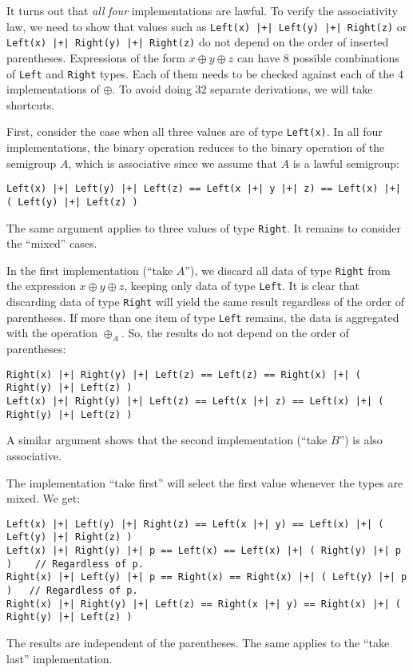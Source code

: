 It turns out that \emph{all} \emph{four} implementations are lawful.
To verify the associativity law, we need to show that values such
as \lstinline!Left(x) |+| Left(y) |+| Right(z)! or \lstinline!Left(x) |+| Right(y) |+| Right(z)!
do not depend on the order of inserted parentheses. Expressions of
the form $x\oplus y\oplus z$ can have $8$ possible combinations
of \lstinline!Left! and \lstinline!Right! types. Each of them needs
to be checked against each of the $4$ implementations of $\oplus$.
To avoid doing $32$ separate derivations, we will take shortcuts.

First, consider the case when all three values are of type \lstinline!Left(x)!.
In all four implementations, the binary operation reduces to the binary
operation of the semigroup $A$, which is associative since we assume
that $A$ is a lawful semigroup:
\begin{lstlisting}
Left(x) |+| Left(y) |+| Left(z) == Left(x |+| y |+| z) == Left(x) |+| ( Left(y) |+| Left(z) )
\end{lstlisting}

The same argument applies to three values of type \lstinline!Right!.
It remains to consider the \textsf{``}mixed\textsf{''} cases.

In the first implementation (\textsf{``}take $A$\textsf{''}), we discard all data
of type \lstinline!Right! from the expression $x\oplus y\oplus z$,
keeping only data of type \lstinline!Left!. It is clear that discarding
data of type \lstinline!Right! will yield the same result regardless
of the order of parentheses. If more than one item of type \lstinline!Left!
remains, the data is aggregated with the operation $\oplus_{A}$.
So, the results do not depend on the order of parentheses:
\begin{lstlisting}
Right(x) |+| Right(y) |+| Left(z) == Left(z) == Right(x) |+| ( Right(y) |+| Left(z) )
Left(x) |+| Right(y) |+| Left(z) == Left(x |+| z) == Left(x) |+| ( Right(y) |+| Left(z) )
\end{lstlisting}

A similar argument shows that the second implementation (\textsf{``}take $B$\textsf{''})
is also associative.

The implementation \textsf{``}take first\textsf{''} will select the first value whenever
the types are mixed. We get:
\begin{lstlisting}[mathescape=true]
Left(x) |+| Left(y) |+| Right(z) == Left(x |+| y) == Left(x) |+| ( Left(y) |+| Right(z) )
Left(x) |+| Right(y) |+| p == Left(x) == Left(x) |+| ( Right(y) |+| p )    // Regardless of p.
Right(x) |+| Left(y) |+| p == Right(x) == Right(x) |+| ( Left(y) |+| p )   // Regardless of p.
Right(x) |+| Right(y) |+| Left(z) == Right(x |+| y) == Right(x) |+| ( Right(y) |+| Left(z) )
\end{lstlisting}
The results are independent of the parentheses. The same applies to
the \textsf{``}take last\textsf{''} implementation.

